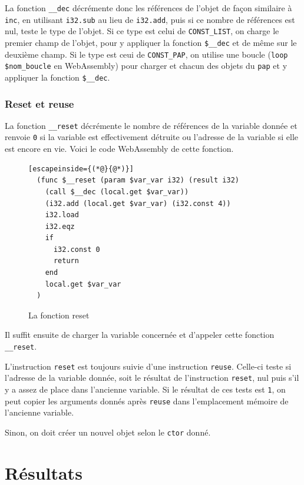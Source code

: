 \documentclass{rapportECL}
\begin{document}
La fonction \verb|__dec| décrémente donc les références de l'objet de façon similaire à \verb|inc|, en utilisant \verb|i32.sub| au lieu de \verb|i32.add|, puis si ce nombre de références est nul, teste le type de l'objet. Si ce type est celui de \verb|CONST_LIST|, on charge le premier champ de l'objet, pour y appliquer la fonction \verb|$__dec| et de même sur le deuxième champ. Si le type est ceui de \verb|CONST_PAP|, on utilise une boucle (\verb|loop $nom_boucle| en WebAssembly) pour charger et chacun des objets du \verb|pap| et y appliquer la fonction \verb|$__dec|.

\subsubsection{Reset et reuse}

La fonction \verb|__reset| décrémente le nombre de références de la variable donnée et renvoie \verb|0| si la variable est effectivement détruite ou l'adresse de la variable si elle est encore en vie. Voici le code WebAssembly de cette fonction.

\begin{figure}[H]
	\begin{lstlisting}[escapeinside={(*@}{@*)}]
  (func $__reset (param $var_var i32) (result i32)
    (call $__dec (local.get $var_var))
    (i32.add (local.get $var_var) (i32.const 4))
    i32.load
    i32.eqz
    if
      i32.const 0
      return
    end
    local.get $var_var
  )
	\end{lstlisting}
	\caption{La fonction reset}
	\label{listing:compile_reset}
\end{figure}

Il suffit ensuite de charger la variable concernée et d'appeler cette fonction \verb|__reset|.

\medskip

L'instruction \verb|reset| est toujours suivie d'une instruction \verb|reuse|. Celle-ci teste si l'adresse de la variable donnée, 
soit le résultat de l'instruction \verb|reset|, nul puis s'il y a assez de place dans l'ancienne variable. Si le résultat de ces
tests est \verb|1|, on peut copier les arguments donnés après \verb|reuse| dans l'emplacement mémoire de l'ancienne variable.

Sinon, on doit créer un nouvel objet selon le \verb|ctor| donné.

\section{Résultats}
\end{document}
